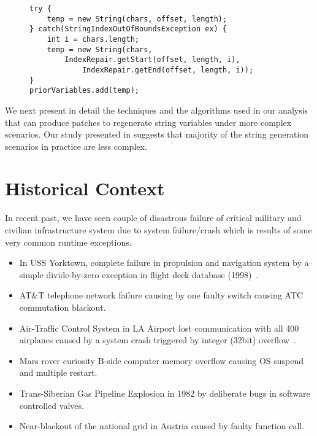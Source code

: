 \lstset{language=java, caption=Patch for the Apache Log4j bug.,
label = snippet:exampleRepairing4, firstnumber =4}
\begin{figure}[t]
\centering
\begin{lstlisting}
try {
    temp = new String(chars, offset, length);
} catch(StringIndexOutOfBoundsException ex) {
    int i = chars.length;
    temp = new String(chars,
        IndexRepair.getStart(offset, length, i),
            IndexRepair.getEnd(offset, length, i));
}
priorVariables.add(temp);
\end{lstlisting}
\end{figure}

We next present in detail the techniques and the algorithms used in our analysis
that can produce patches to regenerate string variables under more complex
scenarios. Our study presented in  suggests that majority
of the string generation scenarios in practice are less complex.

\section{Historical Context}
\label{section:historicalContext}

In recent past, we have seen couple of disastrous failure of critical military
and civilian infrastructure system due to system failure/crash which is results
of some very common runtime exceptions.

\begin{itemize}
  
  \item In USS Yorktown, complete failure in propulsion and navigation system by
  a simple divide-by-zero exception in flight deck database (1998)~\cite{Ship}.
  
  \item AT\&T telephone network failure causing by one faulty switch causing ATC
  commutation blackout.
  
  \item Air-Traffic Control System in LA Airport lost communication with all 400
  airplanes caused by a system crash triggered by integer (32bit)
  overflow~\cite{LAATC}.
  
  \item Mars rover curiosity B-side computer memory overflow causing OS suspend
  and multiple restart.
  
  \item Trans-Siberian Gas Pipeline Explosion in 1982 by deliberate bugs in
  software controlled valves.
  
  \item Near-blackout of the national grid in Austria caused by faulty function
  call.
  
\end{itemize}

